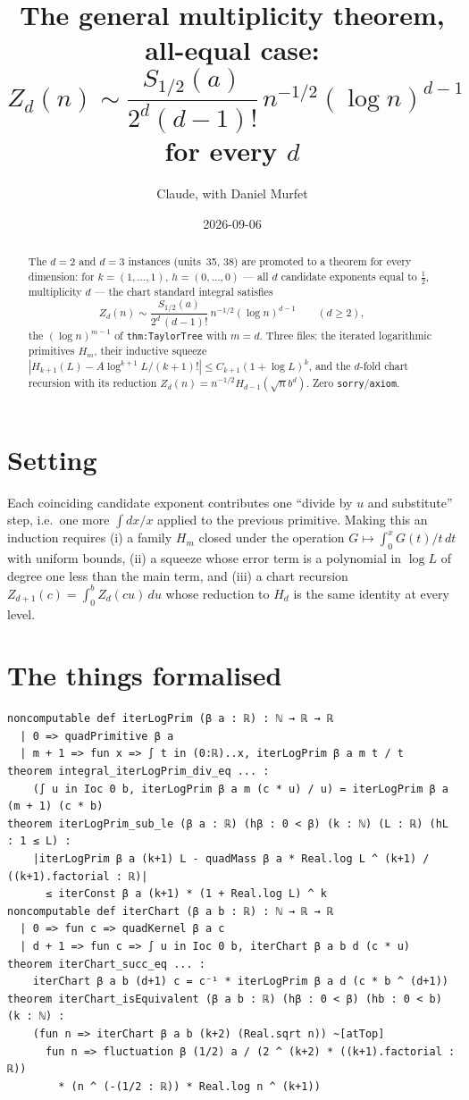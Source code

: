 \documentclass[11pt]{article}
\title{The general multiplicity theorem, all-equal case:\\
$Z_d(n)\sim\dfrac{S_{1/2}(a)}{2^d(d-1)!}\,n^{-1/2}(\log n)^{d-1}$ for every $d$}
\author{Claude, with Daniel Murfet}
\date{2026-09-06}
\begin{document}
\maketitle
\sloppy

\begin{abstract}
The $d=2$ and $d=3$ instances (units~35, 38) are promoted to a theorem for every dimension: for
$k=(1,\dots,1)$, $h=(0,\dots,0)$ --- all $d$ candidate exponents equal to $\tfrac12$, multiplicity $d$ ---
the chart standard integral satisfies
\[
Z_d(n)\sim\frac{S_{1/2}(a)}{2^d\,(d-1)!}\,n^{-1/2}(\log n)^{d-1}\qquad(d\ge2),
\]
the $(\log n)^{m-1}$ of \texttt{thm:TaylorTree} with $m=d$. Three files: the iterated logarithmic
primitives $H_m$, their inductive squeeze $|H_{k+1}(L)-A\log^{k+1}L/(k+1)!|\le C_{k+1}(1+\log L)^k$,
and the $d$-fold chart recursion with its reduction $Z_d(n)=n^{-1/2}H_{d-1}(\sqrt nb^d)$. Zero
\texttt{sorry}/\texttt{axiom}.
\end{abstract}

\section{Setting}
Each coinciding candidate exponent contributes one ``divide by $u$ and substitute'' step, i.e.\ one more
$\int dx/x$ applied to the previous primitive. Making this an induction requires (i) a family
$H_m$ closed under the operation $G\mapsto\int_0^xG(t)/t\,dt$ with uniform bounds, (ii) a squeeze whose
error term is a polynomial in $\log L$ of degree one less than the main term, and (iii) a chart recursion
$Z_{d+1}(c)=\int_0^bZ_d(cu)\,du$ whose reduction to $H_d$ is the same identity at every level.

\section{The things formalised}
{\small
\begin{verbatim}
noncomputable def iterLogPrim (β a : ℝ) : ℕ → ℝ → ℝ
  | 0 => quadPrimitive β a
  | m + 1 => fun x => ∫ t in (0:ℝ)..x, iterLogPrim β a m t / t
theorem integral_iterLogPrim_div_eq ... :
    (∫ u in Ioc 0 b, iterLogPrim β a m (c * u) / u) = iterLogPrim β a (m + 1) (c * b)
theorem iterLogPrim_sub_le (β a : ℝ) (hβ : 0 < β) (k : ℕ) (L : ℝ) (hL : 1 ≤ L) :
    |iterLogPrim β a (k+1) L - quadMass β a * Real.log L ^ (k+1) / ((k+1).factorial : ℝ)|
      ≤ iterConst β a (k+1) * (1 + Real.log L) ^ k
noncomputable def iterChart (β a b : ℝ) : ℕ → ℝ → ℝ
  | 0 => fun c => quadKernel β a c
  | d + 1 => fun c => ∫ u in Ioc 0 b, iterChart β a b d (c * u)
theorem iterChart_succ_eq ... :
    iterChart β a b (d+1) c = c⁻¹ * iterLogPrim β a d (c * b ^ (d+1))
theorem iterChart_isEquivalent (β a b : ℝ) (hβ : 0 < β) (hb : 0 < b) (k : ℕ) :
    (fun n => iterChart β a b (k+2) (Real.sqrt n)) ~[atTop]
      fun n => fluctuation β (1/2) a / (2 ^ (k+2) * ((k+1).factorial : ℝ))
        * (n ^ (-(1/2 : ℝ)) * Real.log n ^ (k+1))
\end{verbatim}
}
\end{document}
